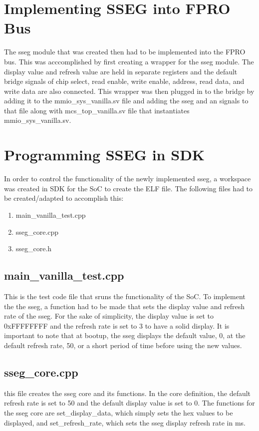 \documentclass{article}
\begin{document}
\section{Implementing SSEG into FPRO Bus}
The sseg module that was created then had to be implemented into the FPRO bus. This was acccomplished by first creating a wrapper for the sseg module. The display value and refresh value are held in separate registers and the default bridge signals of chip select, read enable, write enable, address, read data, and write data are also connected. This wrapper was then plugged in to the bridge by adding it to the mmio\_sys\_vanilla.sv file and adding the sseg and an signals to that file along with mcs\_top\_vanilla.sv file that instantiates mmio\_sys\_vanilla.sv.

\section{Programming SSEG in SDK}
In order to control the functionality of the newly implemented sseg, a workspace was created in SDK for the SoC to create the ELF file. The following files had to be created/adapted to accomplish this:

\begin{enumerate}
	\item main\_vanilla\_test.cpp
	\item sseg\_core.cpp
	\item sseg\_core.h
\end{enumerate} 

\subsection{main\_vanilla\_test.cpp}
This is the test code file that sruns the functionality of the SoC. To implement the the sseg, a function had to be made that sets the display value and refresh rate of the sseg. For the sake of simplicity, the display value is set to 0xFFFFFFFF and the refresh rate is set to 3 to have a solid display. It is important to note that at bootup, the sseg displays the default value, 0, at the default refresh rate, 50, or a short period of time before using the new values. 

\subsection{sseg\_core.cpp}
this file creates the sseg core and its functions. In the core definition, the default refresh rate is set to 50 and the default display value is set to 0. The functions for the sseg core are set\_display\_data, which simply sets the hex values to be displayed, and set\_refresh\_rate, which sets the sseg display refresh rate in ms. 
\end{document}
